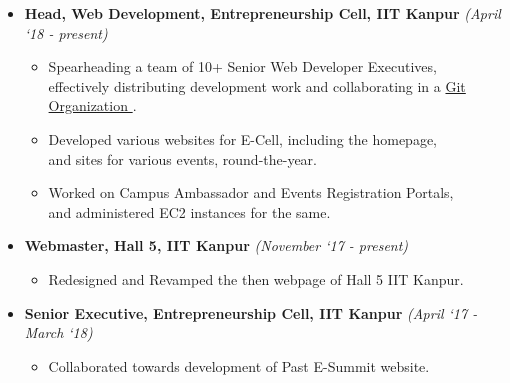 
{\fontsize{11pt}{1em}\bodyfontlight\upshape\color{text}
	\begin{itemize}
		\item \textbf{Head, Web Development, Entrepreneurship Cell, IIT Kanpur}	
			\hfill \textit{(April ‘18 - present)}
			\begin{itemize}
				\item Spearheading a team of 10+ Senior Web Developer Executives,
					\\
					effectively distributing development work and collaborating in a
					\href{https://github.com/ECell-IITK/}{Git Organization \ExternalLink}.
				\item Developed various websites for E-Cell, including the homepage,
					\\
					and sites for various events, round-the-year.
				\item Worked on Campus Ambassador and Events Registration Portals,
					\\
					and administered EC2 instances for the same.
			\end{itemize}

		\item \textbf{Webmaster, Hall 5, IIT Kanpur}
			\hfill \textit{(November ‘17 - present)}
			\begin{itemize}
				\item Redesigned and Revamped the then webpage of Hall 5 IIT Kanpur. 
			\end{itemize}

		\item \textbf{Senior Executive, Entrepreneurship Cell, IIT Kanpur}
			\hfill \textit{(April ‘17 - March ‘18)}
			\begin{itemize}
				\item Collaborated towards development of Past E-Summit website.
			\end{itemize}
	\end{itemize}
}

